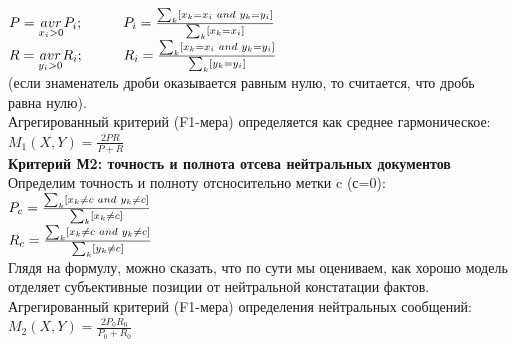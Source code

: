 \documentclass{article}
\begin{document}
\hspace{4cm}$P = \underset{x_i>0}{avr}P_i; \hspace{1cm} P_i = \frac{\sum_{k} [x_k=x_i \hspace{0.1cm} and \hspace{0.1cm} y_k=y_i]}{\sum_{k} [x_k=x_i]}$\\

\hspace{3.5cm}$R = \underset{y_i>0}{avr}R_i; \hspace{1cm} R_i = \frac{\sum_{k} [x_k=x_i \hspace{0.1cm} and \hspace{0.1cm} y_k=y_i]}{\sum_{k} [y_k=y_i]}$\\

(если знаменатель дроби оказывается равным нулю, то считается, что дробь равна нулю).\\
Агрегированный критерий (F1-мера) определяется как среднее гармоническое:\\ 

\hspace{5cm}$M_1(X, Y) = \frac{2PR}{P+R}$\\

\textbf{Критерий М2: точность и полнота отсева нейтральных документов}\\
Определим точность и полноту отсносительно метки c (с=0):\\

\hspace{5cm}$P_c = \frac{\sum_{k} [x_k \neq c \hspace{0.1cm} and \hspace{0.1cm} y_k \neq c]}{\sum_{k} [x_k \neq c]}$\\

\hspace{5cm}$R_c = \frac{\sum_{k} [x_k \neq c \hspace{0.1cm} and \hspace{0.1cm} y_k \neq c]}{\sum_{k} [y_k \neq c]}$\\

Глядя на формулу, можно сказать, что по сути мы оцениваем, как хорошо модель отделяет субъективные позиции от нейтральной констатации фактов.
Агрегированный критерий (F1-мера) определения нейтральных сообщений:\\ 

\hspace{5cm}$M_2(X, Y) = \frac{2P_0R_0}{P_0+R_0}$\\
\end{document}
